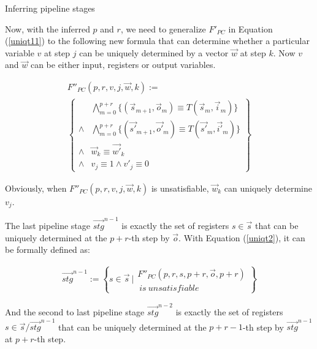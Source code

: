 \documentclass[twocolumn]{article}
\makeatletter
\def\subsection{\@startsection {subsection}{2}{\z@}{16pt plus 2pt minus 2pt}
{6pt plus 2pt minus 2pt}{\normalsize\sl
\edef\@svsec{\thesubsection.\ }}}
\def\thesubsection{\Alph{subsection}}
\makeatother
\begin{document}
\subsection{Inferring pipeline stages}\label{subsec_inferstage}

Now,
with the inferred $p$ and $r$,
we need to generalize $F'_{PC}$ in Equation (\ref{uniqt11}) to the following new formula that
can determine whether a particular variable $v$ at step $j$
can be uniquely determined by a vector $\vec{w}$ at step $k$.
Now $v$ and $\vec{w}$ can be either input, registers or output variables.

\begin{multline}\label{uniqt2}
F''_{PC}(p,r,v,j,\vec{w},k):=\\
\left\{
\begin{array}{cc}
&\bigwedge_{m=0}^{p+r}
\{
(\vec{s}_{m+1},\vec{o}_m)\equiv T(\vec{s}_m,\vec{i}_m)
\}
\\
\wedge&\bigwedge_{m=0}^{p+r}
\{
(\vec{s'}_{m+1},\vec{o'}_m)\equiv T(\vec{s'}_m,\vec{i'}_m)
\}
\\
\wedge&\vec{w}_{k}\equiv \vec{w'}_{k} \\
\wedge& v_{j}\equiv 1 \wedge  v'_{j}\equiv 0 
\end{array}
\right\}
\end{multline}

Obviously,
when $F''_{PC}(p,r,v,j,\vec{w},k)$ is unsatisfiable,
$\vec{w}_k$ can uniquely determine $v_j$.

The last pipeline stage $\vec{stg}^{n-1}$ is 
exactly the set of registers $s\in \vec{s}$ 
that can be uniquely determined at the $p+r$-th step by $\vec{o}$.
With Equation (\ref{uniqt2}),
it can be formally defined as:

\begin{multline}\label{stgn_1}
 \vec{stg}^{n-1} := 
\left\{
 s\in \vec{s} ~| 
\begin{array}{cc}
 F''_{PC}(p,r,
 s,p+r,
 \vec{o},p+r)\\
 ~is~unsatisfiable
\end{array}
\right\}
\end{multline}

And the second to last pipeline stage $\vec{stg}^{n-2}$ 
is exactly the set of registers $s\in \vec{s}/\vec{stg}^{n-1}$
that can be uniquely determined at the $p+r-1$-th step by $\vec{stg}^{n-1}$ at $p+r$-th step.
\end{document}
